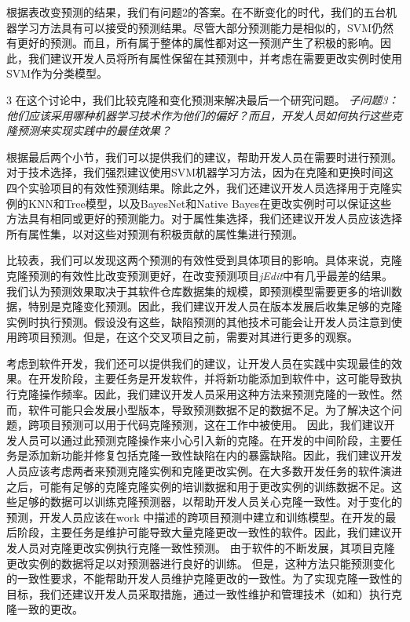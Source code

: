 {{根据表改变预测的结果，我们有问题2的答案。在不断变化的时代，我们的五台机器学习方法具有可以接受的预测结果。尽管大部分预测能力是相似的，SVM仍然有更好的预测。而且，所有属于整体的属性都对这一预测产生了积极的影响。因此，我们建议开发人员将所有属性保留在其预测中，并考虑在需要更改实例时使用SVM作为分类模型。


{3}
在这个讨论中，我们比较克隆和变化预测来解决最后一个研究问题。
{\em {子问题3：}
他们应该采用哪种机器学习技术作为他们的偏好？而且，开发人员如何执行这些克隆预测来实现实践中的最佳效果？
}

根据最后两个小节，我们可以提供我们的建议，帮助开发人员在需要时进行预测。
对于技术选择，我们强烈建议使用SVM机器学习方法，因为在克隆和更换时间这四个实验项目的有效性预测结果。除此之外，我们还建议开发人员选择用于克隆实例的KNN和Tree模型，以及BayesNet和Native Bayes在更改实例时可以保证这些方法具有相同或更好的预测能力。对于属性集选择，我们还建议开发人员应该选择所有属性集，以对这些对预测有积极贡献的属性集进行预测。%

比较表，我们可以发现这两个预测的有效性受到具体项目的影响。具体来说，克隆克隆预测的有效性比改变预测更好，在改变预测项目{\em jEdit}中有几乎最差的结果。我们认为预测效果取决于其软件仓库数据集的规模，即预测模型需要更多的培训数据，特别是克隆变化预测。因此，我们建议开发人员在版本发展后收集足够的克隆实例时执行预测。假设没有这些，缺陷预测的其他技术可能会让开发人员注意到使用跨项目预测。但是，在这个交叉项目之前，需要对其进行更多的观察。


考虑到软件开发，我们还可以提供我们的建议，让开发人员在实践中实现最佳的效果。在开发阶段，主要任务是开发软件，并将新功能添加到软件中，这可能导致执行克隆操作频率。因此，我们建议开发人员采用这种方法来预测克隆的一致性。然而，软件可能只会发展小型版本，导致预测数据不足的数据不足。为了解决这个问题，跨项目预测可以用于代码克隆预测，这在工作中被使用\cite{wang2014predicting}。
因此，我们建议开发人员可以通过此预测克隆操作来小心引入新的克隆。在开发的中间阶段，主要任务是添加新功能并修复包括克隆一致性缺陷在内的暴露缺陷。因此，我们建议开发人员应该考虑两者来预测克隆实例和克隆更改实例。在大多数开发任务的软件演进之后，可能有足够的克隆克隆实例的培训数据和用于更改实例的训练数据不足。这些足够的数据可以训练克隆预测器，以帮助开发人员关心克隆一致性。对于变化的预测，开发人员应该在work \cite{zhang2016predicting}中描述的跨项目预测中建立和训练模型。在开发的最后阶段，主要任务是维护可能导致大量克隆更改一致性的软件。因此，我们建议开发人员对克隆更改实例执行克隆一致性预测。
由于软件的不断发展，其项目克隆更改实例的数据将足以对预测器进行良好的训练。
但是，这种方法只能预测变化的一致性要求，不能帮助开发人员维护克隆更改的一致性。为了实现克隆一致性的目标，我们还建议开发人员采取措施，通过一致性维护和管理技术（如\cite{cheng2016rule}和\cite{nguyen2012clone}）执行克隆一致的更改。

}}
